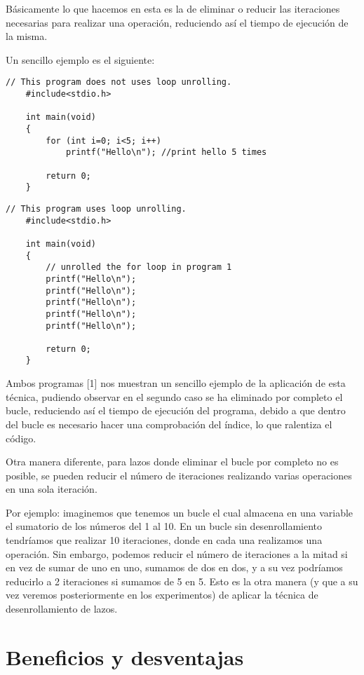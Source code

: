 \documentclass[a4paper,twocolumn]{article}
\begin{document}
Básicamente lo que hacemos en esta es la de eliminar o reducir las iteraciones necesarias para realizar una operación, reduciendo así el tiempo de ejecución de la misma. 

Un sencillo ejemplo es el siguiente:

\begin{lstlisting}[caption={Bucle sin desenrollar},label={lst:codigoC}]
	// This program does not uses loop unrolling. 
	#include<stdio.h> 
	
	int main(void) 
	{ 
		for (int i=0; i<5; i++) 
			printf("Hello\n"); //print hello 5 times 
	
		return 0; 
	}
\end{lstlisting}

\begin{lstlisting}[caption={Bucle aplicando la técnica},label={lst:codigoC}]
	// This program uses loop unrolling. 
	#include<stdio.h> 
	
	int main(void) 
	{ 
		// unrolled the for loop in program 1 
		printf("Hello\n"); 
		printf("Hello\n"); 
		printf("Hello\n"); 
		printf("Hello\n"); 
		printf("Hello\n"); 
	
		return 0; 
	} 
\end{lstlisting}

Ambos programas [1] nos muestran un sencillo ejemplo de la aplicación de esta técnica, pudiendo observar en el segundo caso se ha eliminado por completo el bucle, reduciendo así el tiempo de ejecución del programa, debido a que dentro del bucle es necesario hacer una comprobación del índice, lo que ralentiza el código. 

Otra manera diferente, para lazos donde eliminar el bucle por completo no es posible, se pueden reducir el número de iteraciones realizando varias operaciones en una sola iteración. 

Por ejemplo: imaginemos que tenemos un bucle el cual almacena en una variable el sumatorio de los números del 1 al 10. En un bucle sin desenrollamiento tendríamos que realizar 10 iteraciones, donde en cada una realizamos una operación. Sin embargo, podemos reducir el número de iteraciones a la mitad si en vez de sumar de uno en uno, sumamos de dos en dos, y a su vez podríamos reducirlo a 2 iteraciones si sumamos de 5 en 5. Esto es la otra manera (y que a su vez veremos posteriormente en los experimentos) de aplicar la técnica de desenrollamiento de lazos.

\section{Beneficios y desventajas}
\end{document}
